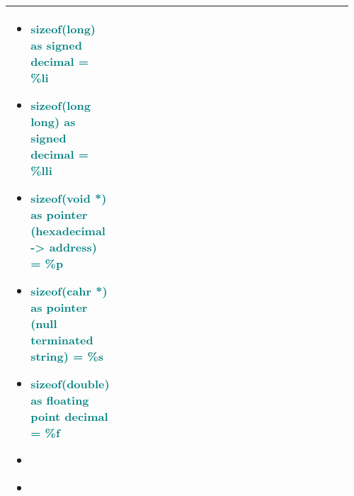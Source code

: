 \documentclass[main.tex,fontsize=8pt,paper=a4,paper=portrait,DIV=calc,]{scrartcl}
\begin{document}
\begin{table}[ht!]
\begin{tabular}{|m{0.2\linewidth}|m{0.755\linewidth}|}
\begin{itemize}
\item \textcolor{teal}{sizeof(long) as signed decimal = \%li}
\item \textcolor{teal}{sizeof(long long) as signed decimal = \%lli}
\item \textcolor{teal}{sizeof(void *) as pointer (hexadecimal -> address) = \%p}
\item \textcolor{teal}{sizeof(cahr *) as pointer (null terminated string) = \%s}
\item \textcolor{teal}{sizeof(double) as floating point decimal = \%f}
\item \textcolor{teal}{}
\item \textcolor{teal}{}
\vspace{-3mm}
\end{itemize}\\
\hline
\end{tabular}

\end{table}
\end{document}

